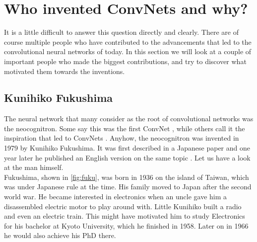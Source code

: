 \section{Who invented ConvNets and why?}

It is a little difficult to answer this question directly and clearly. There are of course multiple people who have contributed to the advancements that led to the convolutional neural networks of today. In this section we will look at a couple of important people who made the biggest contributions, and try to discover what motivated them towards the inventions.\\

\subsection{Kunihiko Fukushima}

The neural network that many consider as the root of convolutional networks was the neocognitron. Some say this was the first ConvNet \cite{sch, fuzzy}, while others call it the inspiration that led to ConvNets \cite{dl-lecun, history}. Anyhow, the neocognitron was invented in 1979 by Kunihiko Fukushima. It was first described in a Japanese paper \cite{jap} and one year later he published an English version on the same topic \cite{neocog}. Let us have a look at the man himself.\\

Fukushima, shown in \autoref{fig:fuku}, was born in 1936 \cite{about-fuku} on the island of Taiwan, which was under Japanese rule at the time. His family moved to Japan after the second world war. He became interested in electronics when an uncle gave him a disassembled electric motor to play around with. Little Kunihiko built a radio and even an electric train. This might have motivated him to study Electronics for his bachelor at Kyoto University, which he finished in 1958. Later on in 1966 he would also achieve his PhD there.\\

